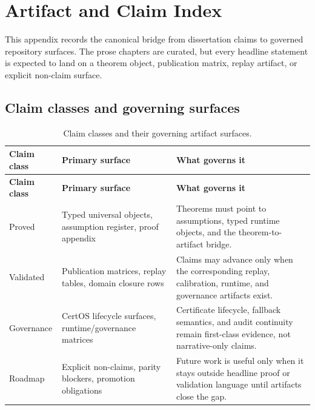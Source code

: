 \chapter{Artifact and Claim Index}
\label{app:artifact-and-claim-index}

This appendix records the canonical bridge from dissertation claims to governed repository
surfaces. The prose chapters are curated, but every headline statement is expected to land
on a theorem object, publication matrix, replay artifact, or explicit non-claim surface.

\section{Claim classes and governing surfaces}
\begin{longtable}{p{}p{}p{}}
\caption{Claim classes and their governing artifact surfaces.}\label{tab:artifact-claim-index}\\
\toprule
\textbf{Claim class} & \textbf{Primary surface} & \textbf{What governs it}\\
\midrule
\endfirsthead
\toprule
\textbf{Claim class} & \textbf{Primary surface} & \textbf{What governs it}\\
\midrule
\endhead
Proved & Typed universal objects, assumption register, proof appendix & Theorems must point to assumptions, typed runtime objects, and the theorem-to-artifact bridge.\\
Validated & Publication matrices, replay tables, domain closure rows & Claims may advance only when the corresponding replay, calibration, runtime, and governance artifacts exist.\\
Governance & CertOS lifecycle surfaces, runtime/governance matrices & Certificate lifecycle, fallback semantics, and audit continuity remain first-class evidence, not narrative-only claims.\\
Roadmap & Explicit non-claims, parity blockers, promotion obligations & Future work is useful only when it stays outside headline proof or validation language until artifacts close the gap.\\
\bottomrule
\end{longtable}

